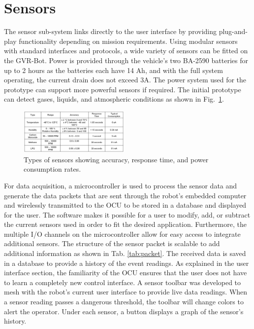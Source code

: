 \section{Sensors}\label{sec:sensors}

The sensor sub-system links directly to the user interface by providing plug-and-play functionality depending on mission requirements. Using modular sensors with standard interfaces and protocols, a wide variety of sensors can be fitted on the GVR-Bot. Power is provided through the vehicle's two BA-2590 batteries for up to 2 hours as the batteries each have 14 Ah, and with the full system operating, the current drain does not exceed 3A. The power system used for the prototype can support more powerful sensors if required. The initial prototype can detect gases, liquids, and atmospheric conditions as shown in Fig.~\ref{fig:params}.

\begin{figure}
	\centering
	\includegraphics[width=0.48\textwidth]{./pictures/sensor_params.png}
	\caption{Types of sensors showing accuracy, response time, and power consumption rates.}
	\label{fig:params}
\end{figure}

For data acquisition, a microcontroller is used to process the sensor data and generate the data packets that are sent through the robot's embedded computer and wirelessly transmitted to the OCU to be stored in a database and displayed for the user. The software makes it possible for a user to modify, add, or subtract the current sensors used in order to fit the desired application. Furthermore, the multiple I/O channels on the microcontroller allow for easy access to integrate additional sensors. The structure of the sensor packet is scalable to add additional information as shown in Tab. \ref{tab:packet}. The received data is saved in a database to provide a history of the event readings. As explained in the user interface section, the familiarity of the OCU ensures that the user does not have to learn a completely new control interface. A sensor toolbar was developed to mesh with the robot's current user interface to provide live data readings. When a sensor reading passes a dangerous threshold, the toolbar will change colors to alert the operator. Under each sensor, a button displays a graph of the sensor's history.

